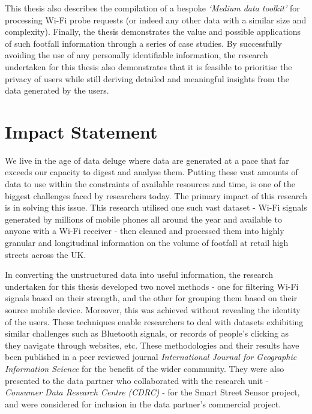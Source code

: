 This thesis also describes the compilation of a bespoke \textit{`Medium data toolkit'} for processing Wi-Fi probe requests (or indeed any other data with a similar size and complexity).
Finally, the thesis demonstrates the value and possible applications of such footfall information through a series of case studies.
By successfully avoiding the use of any personally identifiable information, the research undertaken for this thesis also demonstrates that it is feasible to prioritise the privacy of users while still deriving detailed and meaningful insights from the data generated by the users.

\pagebreak

\section*{Impact Statement}
We live in the age of data deluge where data are generated at a pace that far exceeds our capacity to digest and analyse them.
Putting these vast amounts of data to use within the constraints of available resources and time, is one of the biggest challenges faced by researchers today.
The primary impact of this research is in solving this issue.
This research utilised one such vast dataset - Wi-Fi signals generated by millions of mobile phones all around the year and available to anyone with a Wi-Fi receiver - then cleaned and processed them into highly granular and longitudinal information on the volume of footfall at retail high streets across the UK.

In  converting the unstructured data into useful information, the research undertaken for this thesis developed two novel methods - one for filtering Wi-Fi signals based on their strength, and the other for grouping them based on their source mobile device.
Moreover, this was achieved without revealing the identity of the users.
These techniques enable researchers to deal with datasets exhibiting similar challenges such as Bluetooth signals, or records of people's clicking as they navigate through websites, etc.
These methodologies and their results have been published in a peer reviewed journal \textit{International Journal for Geographic Information Science} for the benefit of the wider community.
They were also presented to the data partner who collaborated with the research unit - \textit{Consumer Data Research Centre (CDRC)} - for the Smart Street Sensor project, and were considered for inclusion in the data partner's commercial project.

